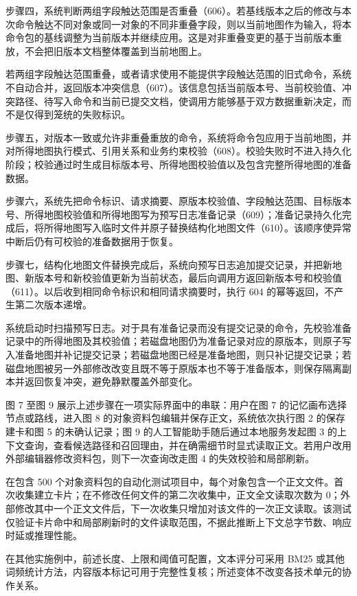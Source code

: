  步骤四，系统判断两组字段触达范围是否重叠（606）。若基线版本之后的修改与本次命令触达不同对象或同一对象的不同非重叠字段，则以当前地图作为输入，将本命令包的基线调整为当前版本并继续应用。这是对非重叠变更的基于当前版本重放，不会把旧版本文档整体覆盖到当前地图上。

 若两组字段触达范围重叠，或者请求使用不能提供字段触达范围的旧式命令，系统不自动合并，返回版本冲突信息（607）。该信息包括当前版本号、当前校验值、冲突路径、待写入命令和当前已提交文档，使调用方能够基于双方数据重新决定，而不是仅得到笼统的失败标识。

 步骤五，对版本一致或允许非重叠重放的命令，系统将命令包应用于当前地图，并对所得地图执行模式、引用关系和业务约束校验（608）。校验失败时不进入持久化阶段；校验通过时生成目标版本号、所得地图校验值以及包含完整所得地图的准备数据。

 步骤六，系统先把命令标识、请求摘要、原版本校验值、字段触达范围、目标版本号、所得地图校验值和所得地图写为预写日志准备记录（609）；准备记录持久化完成后，将所得地图写入临时文件并原子替换结构化地图文件（610）。该顺序使异常中断后仍有可校验的准备数据用于恢复。

 步骤七，结构化地图文件替换完成后，系统向预写日志追加提交记录，并把新地图、新版本号和新校验值更新为当前状态，最后向调用方返回新版本号和校验值（611）。以后收到相同命令标识和相同请求摘要时，执行 604 的幂等返回，不产生第二次版本递增。

 系统启动时扫描预写日志。对于具有准备记录而没有提交记录的命令，先校验准备记录中的所得地图及其校验值；若磁盘地图仍为准备记录对应的原版本，则原子写入准备地图并补记提交记录；若磁盘地图已经是准备地图，则只补记提交记录；若磁盘地图被另一外部修改改变且既不等于原版本也不等于准备版本，则保存隔离副本并返回恢复冲突，避免静默覆盖外部变化。

 图 7 至图 9 展示上述步骤在一项实际界面中的串联：用户在图 7 的记忆画布选择节点或路线，进入图 8 的对象资料包编辑并保存正文，系统依次执行图 2 的保存建卡和图 5 的未确认记录；图 9 的人工智能助手随后通过本地服务发起图 3 的上下文查询，查看候选路径和召回理由，并在确需细节时显式读取正文。若用户改用外部编辑器修改资料包，则下一次查询改走图 4 的失效校验和局部刷新。

 在包含 500 个对象资料包的自动化测试项目中，每个对象包含一个正文文件。首次收集建立卡片；在不修改任何文件的第二次收集中，正文全文读取次数为 0；外部修改其中一个正文文件后，下一次收集只增加对该文件的一次正文读取。该测试仅验证卡片命中和局部刷新时的文件读取范围，不据此推断上下文总字节数、响应时延或推理性能。

 在其他实施例中，前述长度、上限和阈值可配置，文本评分可采用 BM25 或其他词频统计方法，内容版本标记可用于完整性复核；所述变体不改变各技术单元的协作关系。
